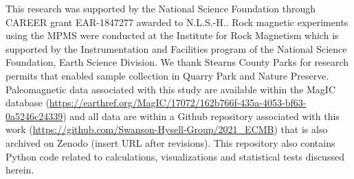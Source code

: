 \documentclass[draft]{agujournal2019}
\begin{document}


%
%
%
%
%
%
%
%


\acknowledgments
This research was supported by the National Science Foundation through CAREER grant EAR-1847277 awarded to N.L.S.-H.. Rock magnetic experiments using the MPMS were conducted at the Institute for Rock Magnetism which is supported by the Instrumentation and Facilities program of the National Science Foundation, Earth Science Division. We thank Stearns County Parks for research permits that enabled sample collection in Quarry Park and Nature Preserve. Paleomagnetic data associated with this study are available within the MagIC database (\url{https://earthref.org/MagIC/17072/162b766f-435a-4053-bf63-0a5246c24339}) and all data are within a Github repository associated with this work (\url{https://github.com/Swanson-Hysell-Group/2021_ECMB}) that is also archived on Zenodo (insert URL after revisions). This repository also contains Python code related to calculations, visualizations and statistical tests discussed herein.  

\end{document}
